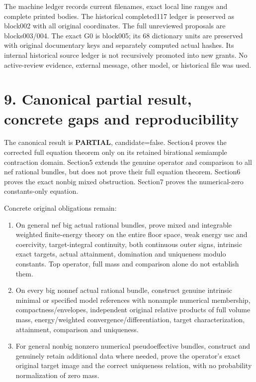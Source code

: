 \documentclass[
  10pt,
]{article}
\providecommand{\tightlist}{%
  \setlength{\itemsep}{0pt}\setlength{\parskip}{0pt}}
\begin{document}
The machine ledger records current filenames, exact local line ranges
and complete printed bodies. The historical completed117 ledger is
preserved as block002 with all original coordinates. The full unreviewed
proposals are blocks003/004. The exact G0 is block005; its 68 dictionary
units are preserved with original documentary keys and separately
computed actual hashes. Its internal historical source ledger is not
recursively promoted into new grants. No active-review evidence,
external message, other model, or historical file was used.

\section{9. Canonical partial result, concrete gaps and
reproducibility}\label{canonical-partial-result-concrete-gaps-and-reproducibility}

The canonical result is \textbf{PARTIAL}, candidate=false. Section4
proves the corrected full equation theorem only on its retained
birational semiample contraction domain. Section5 extends the genuine
operator and comparison to all nef rational bundles, but does not prove
their full equation theorem. Section6 proves the exact nonbig mixed
obstruction. Section7 proves the numerical-zero constants-only equation.

Concrete original obligations remain:

\begin{enumerate}
\def\labelenumi{\arabic{enumi}.}
\tightlist
\item
  On general nef big actual rational bundles, prove mixed and integrable
  weighted finite-energy theory on the entire floor space, weak energy
  usc and coercivity, target-integral continuity, both continuous outer
  signs, intrinsic exact targets, actual attainment, domination and
  uniqueness modulo constants. Top operator, full mass and comparison
  alone do not establish them.
\item
  On every big nonnef actual rational bundle, construct genuine
  intrinsic minimal or specified model references with nonample
  numerical membership, compactness/envelopes, independent original
  relative products of full volume mass, energy/weighted
  convergence/differentiation, target characterization, attainment,
  comparison and uniqueness.
\item
  For general nonbig nonzero numerical pseudoeffective bundles,
  construct and genuinely retain additional data where needed, prove the
  operator's exact original target image and the correct uniqueness
  relation, with no probability normalization of zero mass.
\end{enumerate}
\end{document}
